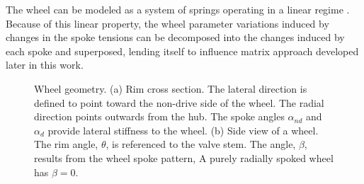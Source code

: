 \documentclass[journal]{IEEEtran}
\begin{document}
The wheel can be modeled as a system of springs operating in a linear regime \cite{FordThesis}. Because of this linear property, the wheel parameter variations induced by changes in the spoke tensions can be decomposed into the changes induced by each spoke and superposed, lending itself to influence matrix approach developed later in this work.

\begin{figure}[!t]
\centering
    \caption{Wheel geometry. (a)  Rim cross section.  The lateral direction is defined to point toward the non-drive side of the wheel.  The radial direction points outwards from the hub.  The spoke angles $\alpha_{{nd}}$ and $\alpha_{{d}}$ provide lateral stiffness to the wheel. (b) Side view of a wheel. The rim angle, $\theta$, is referenced to the valve stem.  The angle, $\beta$, results from the wheel spoke pattern,  A purely radially spoked wheel has $\beta = 0$.}
    \label{fig:geom}
    \end{figure}
\end{document}

